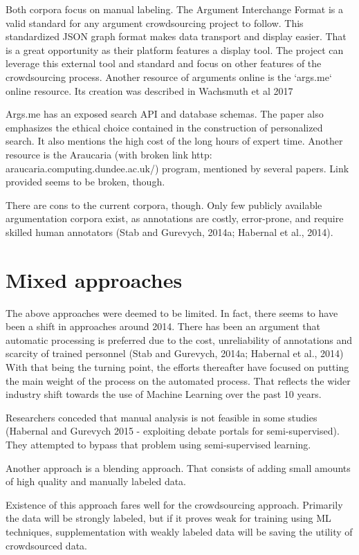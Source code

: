 \documentclass{report}
\begin{document}
Both corpora focus on manual labeling.
The Argument Interchange Format is a valid standard for any argument crowdsourcing project to follow.  This standardized JSON graph format makes data transport and display easier. That is a great opportunity as their platform features a display tool.  The project can leverage this external tool and standard and focus on other features of the crowdsourcing process.
Another resource of arguments online is the `args.me` online resource. 
Its creation was described in Wachsmuth et al 2017

Args.me has an exposed search API and database schemas. The paper also emphasizes the ethical choice contained in the construction of personalized search.
It also mentions the high cost of the long hours of expert time.
Another resource is the  Araucaria (with broken link  http:\\araucaria.computing.dundee.ac.uk/) program, mentioned by several papers. Link provided seems to be broken, though. 

There are cons to the current corpora, though.
Only few publicly available argumentation corpora exist, as annotations are costly, error-prone, and require skilled human annotators (Stab and Gurevych, 2014a; Habernal et al., 2014).

\section{Mixed approaches}
The above approaches were deemed to be limited. In fact, there seems to have been a shift in approaches around 2014.
There has been an argument that automatic processing is preferred due to the cost, unreliability of annotations and scarcity of trained personnel
(Stab and Gurevych, 2014a; Habernal et al., 2014)
With that being the turning point, the efforts thereafter have focused on putting the main weight of the process on the automated process. 
That reflects the wider industry shift towards the use of Machine Learning over the past 10 years.

Researchers conceded that manual analysis is not feasible in some studies (Habernal and Gurevych 2015 - exploiting debate portals for semi-supervised).
They attempted to bypass that problem using semi-supervised learning.

Another approach is a blending approach.\cite{shnarch_will_2018} That consists of adding small amounts of high quality and manually labeled data.

Existence of this approach fares well for the crowdsourcing approach. Primarily the data will be strongly labeled, but if it proves weak for training using ML techniques, 
supplementation with weakly labeled data will be saving the utility of crowdsourced data.
\end{document}
